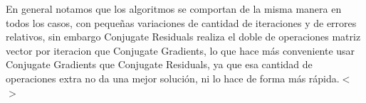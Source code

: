 \documentclass{article}
\begin{document}
En general notamos que los algoritmos se comportan de la misma manera en todos los casos, con pequeñas variaciones de cantidad de iteraciones y de errores relativos, sin embargo Conjugate Residuals realiza el doble de operaciones matriz vector por iteracion que Conjugate Gradients, lo que hace más conveniente usar Conjugate Gradients que Conjugate Residuals, ya que esa cantidad de operaciones extra no da una mejor solución, ni lo hace de forma más rápida.$<$ $>$
\end{document}
